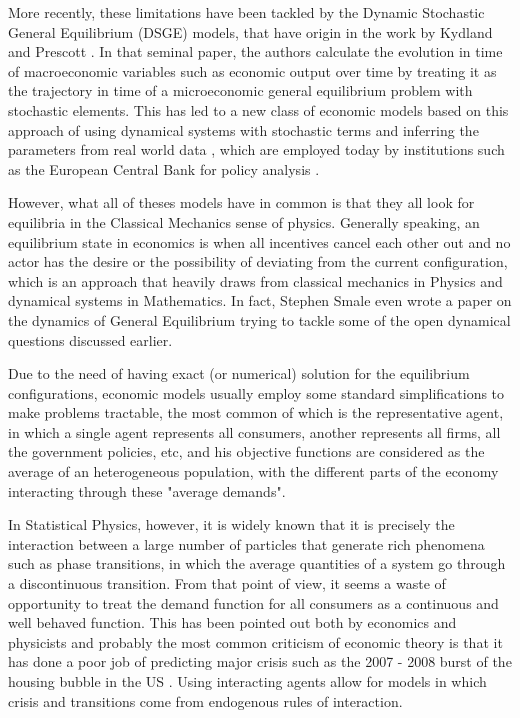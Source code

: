 More recently, these limitations have been tackled by the Dynamic Stochastic General Equilibrium (DSGE) models, that have origin in the work by Kydland and Prescott \cite{kydland1982}. In that seminal paper, the authors calculate the evolution in time of macroeconomic variables such as economic output over time by treating it as the trajectory in time of a microeconomic general equilibrium problem with stochastic elements. This has led to a new class of economic models based on this approach of using dynamical systems with stochastic terms and inferring the parameters from real world data \cite{christiano2005, smets2007}, which are employed today by institutions such as the European Central Bank for policy analysis \cite{smets2003}.

However, what all of theses models have in common is that they all look for equilibria in the Classical Mechanics sense of physics. Generally speaking, an equilibrium state in economics is when all incentives cancel each other out and no actor has the desire or the possibility of deviating from the current configuration, which is an approach that heavily draws from classical mechanics in Physics and dynamical systems in Mathematics. In fact, Stephen Smale even wrote a paper on the dynamics of General Equilibrium \cite{smale1976} trying to tackle some of the open dynamical questions discussed earlier.

Due to the need of having exact (or numerical) solution for the equilibrium configurations, economic models usually employ some standard simplifications to make problems tractable, the most common of which is the representative agent, in which a single agent represents all consumers, another represents all firms, all the government policies, etc, and his objective functions are considered as the average of an heterogeneous population, with the different parts of the economy interacting through these "average demands". 

In Statistical Physics, however, it is widely known that it is precisely the interaction between a large number of particles that generate rich phenomena such as phase transitions, in which the average quantities of a system go through a discontinuous transition. From that point of view, it seems a waste of opportunity to treat the demand function for all consumers as a continuous and well behaved function. This has been pointed out both by economics \cite{Kirman92, KirmanBook} and physicists \cite{Bouchaud13, Bouchaud07} and  probably the most common criticism of economic theory is that it has done a poor job of predicting major crisis such as the 2007 - 2008 burst of the housing bubble in the US \cite{BouchaudCrisis}. Using interacting agents allow for models in which crisis and transitions come from endogenous rules of interaction.

